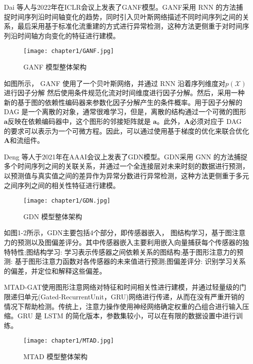 Dai 等人\cite{ganf}与2022年在ICLR会议上发表了GANF模型。GANF采用 RNN 的方法捕捉时间序列沿时间轴变化的趋势，同时引入贝叶斯网络描述不同时间序列之间的关系，最后采用基于标准化流重建的方式进行异常检测，这种方法更侧重于对时间序列沿时间轴方向变化的特征进行建模。
\begin{figure}[htb]
    \centering
    \texttt{[image: chapter1/GANF.jpg]}
    \caption{GANF 模型整体架构\cite{ganf}}
    \end{figure}
如图所示， GANF 使用了一个贝叶斯网络，并通过 RNN 沿着序列维度对$p(\mathcal{X})$ 进行因子分解 然后使用条件规范化流对时间维度进行因子分解。然后，采用一种新的基于图的依赖性编码器来参数化因子分解产生的条件概率。用于因子分解的 DAG 是一个离散的对象，通常很难学习，但是，离散的结构通过一个可微的图形 $\mathbf { a } $反映在依赖编码器中，这个图形的邻接矩阵就是 $\mathbf { a } $。此外，$\mathbf { A } $必须对应于 DAG 的要求可以表示为一个可微方程。因此，可以通过使用基于梯度的优化来联合优化 $\mathbf { A } $和流组件。

Deng 等人\cite{gdn}于2021年在AAAI会议上发表了GDN模型。GDN采用 GNN 的方法捕捉多个时间序列之间的关联关系，并通过一个全连接层对未来时刻的数据进行预测，以预测值与真实值之间的差异作为异常分数进行异常检测，这种方法更侧重于多元之间序列之间的相关性特征进行建模。
\begin{figure}[ht]
    \centering
    \texttt{[image: chapter1/GDN.jpg]}
    \caption{GDN 模型整体架构\cite{gdn}}
    \end{figure}
如图1-2所示，GDN主要包括4个部分，即传感器嵌入， 图结构学习，基于图注意力的预测以及图偏差评分。其中传感器嵌入主要利用嵌入向量捕获每个传感器的独特特性;图结构学习: 学习表示传感器之间依赖关系的图结构;基于图形注意力的预测: 基于图形注意力函数对各传感器的未来值进行预测;图偏差评分: 识别学习关系的偏差，并定位和解释这些偏差。

MTAD-GAT\cite{mtad-gat}使用图形注意网络对特征和时间相关性进行建模，并通过轻量级的门限递归单元(Gated-RecurrentUnit，GRU)网络进行传递，从而在没有严重开销的情况下帮助检测。传统上，注意力操作使用神经网络确定权重的凸组合进行输入压缩。GRU 是 LSTM 的简化版本，参数集较小，可以在有限的数据设置中进行训练。
\begin{figure}[htb]
    \centering
    \texttt{[image: chapter1/MTAD.jpg]}
    \caption{MTAD 模型整体架构\cite{mtad-gat}}
    \end{figure}


